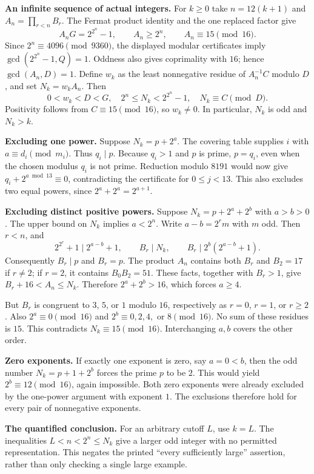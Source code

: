 \documentclass[10pt,a4paper]{article}
\newcommand{\F}[1]{2^{2^{#1}}+1}
\begin{document}
\textbf{An infinite sequence of actual integers.}
For $k\ge0$ take $n=12(k+1)$ and $A_n=\prod_{r<n}B_r$.
The Fermat product identity and the one replaced factor give
\[
 A_nG=2^{2^n}-1,\qquad A_n\ge2^n,\qquad A_n\equiv15\pmod{16}.
\]
Since $2^n\equiv4096\pmod{9360}$, the displayed modular certificates imply
$\gcd(2^{2^n}-1,Q)=1$. Oddness also gives coprimality with $16$; hence
$\gcd(A_n,D)=1$. Define $w_k$ as the least nonnegative residue of $A_n^{-1}C$
modulo $D$, and set $N_k=w_kA_n$. Then
\[
 0<w_k<D<G,\quad 2^n\le N_k<2^{2^n}-1,\quad
 N_k\equiv C\pmod D.
\]
Positivity follows from $C\equiv15\pmod{16}$, so $w_k\ne0$.
In particular, $N_k$ is odd and $N_k>k$.

\newpage
\textbf{Excluding one power.}
Suppose $N_k=p+2^a$. The covering table supplies $i$ with
$a\equiv d_i\pmod{m_i}$. Thus $q_i\mid p$. Because $q_i>1$ and $p$ is prime,
$p=q_i$, even when the chosen modulus $q_i$ is not prime.
Reduction modulo $8191$ would now give
$q_i+2^{a\bmod13}\equiv0$, contradicting the certificate for $0\le j<13$.
This also excludes two equal powers, since $2^a+2^a=2^{a+1}$.

\textbf{Excluding distinct positive powers.}
Suppose $N_k=p+2^a+2^b$ with $a>b>0$. The upper bound on $N_k$ implies
$a<2^n$. Write $a-b=2^rm$ with $m$ odd. Then $r<n$, and
\[
 \F r\mid2^{a-b}+1,
 \qquad B_r\mid N_k,
 \qquad B_r\mid 2^b(2^{a-b}+1).
\]
Consequently $B_r\mid p$ and $B_r=p$.
The product $A_n$ contains both $B_r$ and $B_2=17$ if $r\ne2$;
if $r=2$, it contains $B_0B_2=51$. These facts, together with $B_r>1$,
give $B_r+16<A_n\le N_k$. Therefore $2^a+2^b>16$, which forces $a\ge4$.

But $B_r$ is congruent to $3$, $5$, or $1$ modulo $16$, respectively as
$r=0$, $r=1$, or $r\ge2$. Also $2^a\equiv0\pmod{16}$ and
$2^b\equiv0,2,4,$ or $8\pmod{16}$. No sum of these residues is $15$.
This contradicts $N_k\equiv15\pmod{16}$. Interchanging $a,b$ covers the other order.

\textbf{Zero exponents.}
If exactly one exponent is zero, say $a=0<b$, then the odd number
$N_k=p+1+2^b$ forces the prime $p$ to be $2$. This would yield
$2^b\equiv12\pmod{16}$, again impossible. Both zero exponents were already
excluded by the one-power argument with exponent $1$.
The exclusions therefore hold for every pair of nonnegative exponents.

\textbf{The quantified conclusion.}
For an arbitrary cutoff $L$, use $k=L$. The inequalities
$L<n<2^n\le N_k$ give a larger odd integer with no permitted representation.
This negates the printed ``every sufficiently large'' assertion, rather than only
checking a single large example.
\end{document}
